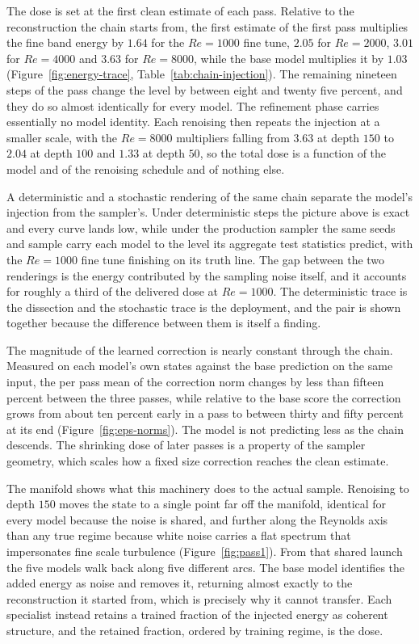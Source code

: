 The dose is set at the first clean estimate of each pass. Relative to the
reconstruction the chain starts from, the first estimate of the first pass
multiplies the fine band energy by $1.64$ for the $Re=1000$ fine tune, $2.05$
for $Re=2000$, $3.01$ for $Re=4000$ and $3.63$ for $Re=8000$, while the base
model multiplies it by $1.03$ (Figure~\ref{fig:energy-trace},
Table~\ref{tab:chain-injection}). The remaining nineteen steps of the pass
change the level by between eight and twenty five percent, and they do so
almost identically for every model. The refinement phase carries essentially
no model identity. Each renoising then repeats the injection at a smaller
scale, with the $Re=8000$ multipliers falling from $3.63$ at depth $150$ to
$2.04$ at depth $100$ and $1.33$ at depth $50$, so the total dose is a
function of the model and of the renoising schedule and of nothing else.

A deterministic and a stochastic rendering of the same chain separate the
model's injection from the sampler's. Under deterministic steps the picture
above is exact and every curve lands low, while under the production sampler
the same seeds and sample carry each model to the level its aggregate test
statistics predict, with the $Re=1000$ fine tune finishing on its truth line.
The gap between the two renderings is the energy contributed by the sampling
noise itself, and it accounts for roughly a third of the delivered dose at
$Re=1000$. The deterministic trace is the dissection and the stochastic trace
is the deployment, and the pair is shown together because the difference
between them is itself a finding.

The magnitude of the learned correction is nearly constant through the chain.
Measured on each model's own states against the base prediction on the same
input, the per pass mean of the correction norm changes by less than fifteen
percent between the three passes, while relative to the base score the
correction grows from about ten percent early in a pass to between thirty and
fifty percent at its end (Figure~\ref{fig:eps-norms}). The model is not
predicting less as the chain descends. The shrinking dose of later passes is a
property of the sampler geometry, which scales how a fixed size correction
reaches the clean estimate.

The manifold shows what this machinery does to the actual sample. Renoising to
depth $150$ moves the state to a single point far off the manifold, identical
for every model because the noise is shared, and further along the Reynolds
axis than any true regime because white noise carries a flat spectrum that
impersonates fine scale turbulence (Figure~\ref{fig:pass1}). From that shared
launch the five models walk back along five different arcs. The base model
identifies the added energy as noise and removes it, returning almost exactly
to the reconstruction it started from, which is precisely why it cannot
transfer. Each specialist instead retains a trained fraction of the injected
energy as coherent structure, and the retained fraction, ordered by training
regime, is the dose.

